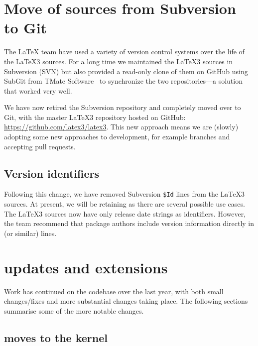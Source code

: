 \documentclass{ltnews}
\begin{document}
\maketitle

\tableofcontents


\section{Move of sources from Subversion to Git}

The \LaTeX{} team have used a variety of version control systems over the life
of the \LaTeX3 sources. For a long time we maintained the \LaTeX3 sources in
Subversion (SVN) but also provided a read-only clone of them on GitHub using
SubGit from TMate Software~\cite{SubGit} to synchronize the two
repositories---a solution that worked very well.

We have now retired the Subversion repository and completely moved over to Git,
with the master \LaTeX3 repository hosted on GitHub:
\url{https://github.com/latex3/latex3}. This new approach means we are (slowly)
adopting some new approaches to development, for example branches and accepting
pull requests.

\subsection{Version identifiers}

Following this change, we have removed Subversion \verb=$Id= lines from the
\LaTeX3 sources. At present, we will be retaining  as there are
several possible use cases. The \LaTeX3 sources now have only release date
strings as identifiers. However, the team recommend that package authors
include version information directly in  (or similar)
lines.

\section{ updates and extensions}

Work has continued on the codebase over the last year, with both small
changes/fixes and more substantial changes taking place. The following sections
summarise some of the more notable changes.

\subsection{ moves to the kernel}
\end{document}
